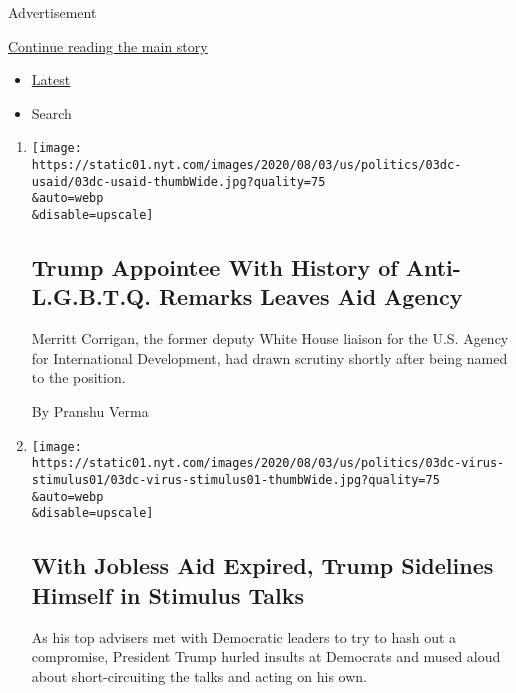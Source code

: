 Advertisement

\protect\hyperlink{after-mid1}{Continue reading the main story}

\begin{itemize}
\tightlist
\item
  \protect\hyperlink{stream-panel}{Latest}
\item
  Search
\end{itemize}

\begin{enumerate}
\def\labelenumi{\arabic{enumi}.}
\item
  \href{/2020/08/03/us/politics/merritt-corrigan-usaid.html}{}

  \texttt{[image: https://static01.nyt.com/images/2020/08/03/us/politics/03dc-usaid/03dc-usaid-thumbWide.jpg?quality=75\\\&auto=webp\\\&disable=upscale]}

  \hypertarget{trump-appointee-with-history-of-anti-lgbtq-remarks-leaves-aid-agency}{%
  \subsection{Trump Appointee With History of Anti-L.G.B.T.Q. Remarks
  Leaves Aid
  Agency}\label{trump-appointee-with-history-of-anti-lgbtq-remarks-leaves-aid-agency}}

  Merritt Corrigan, the former deputy White House liaison for the U.S.
  Agency for International Development, had drawn scrutiny shortly after
  being named to the position.

  By Pranshu Verma
\item
  \href{/2020/08/03/us/politics/congress-jobless-aid-talks-trump.html}{}

  \texttt{[image: https://static01.nyt.com/images/2020/08/03/us/politics/03dc-virus-stimulus01/03dc-virus-stimulus01-thumbWide.jpg?quality=75\\\&auto=webp\\\&disable=upscale]}

  \hypertarget{with-jobless-aid-expired-trump-sidelines-himself-in-stimulus-talks-1}{%
  \subsection{With Jobless Aid Expired, Trump Sidelines Himself in
  Stimulus
  Talks}\label{with-jobless-aid-expired-trump-sidelines-himself-in-stimulus-talks-1}}

  As his top advisers met with Democratic leaders to try to hash out a
  compromise, President Trump hurled insults at Democrats and mused
  aloud about short-circuiting the talks and acting on his own.


\end{enumerate}
